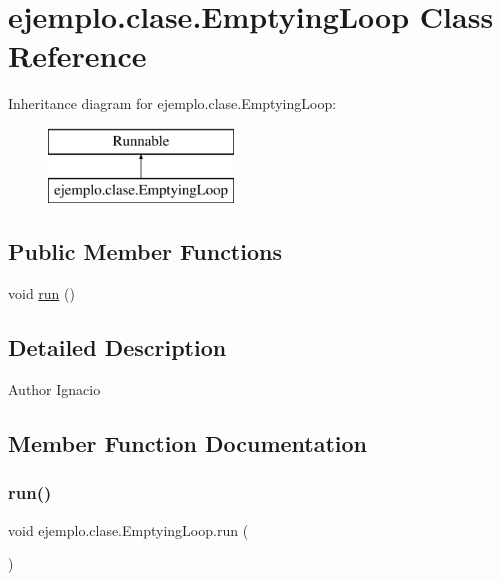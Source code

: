 \hypertarget{classejemplo_1_1clase_1_1_emptying_loop}{}\section{ejemplo.\+clase.\+Emptying\+Loop Class Reference}
\label{classejemplo_1_1clase_1_1_emptying_loop}
Inheritance diagram for ejemplo.\+clase.\+Emptying\+Loop\+:\begin{figure}[H]
\begin{center}
\leavevmode
\includegraphics[height=2.000000cm]{classejemplo_1_1clase_1_1_emptying_loop}
\end{center}
\end{figure}
\subsection*{Public Member Functions}
\begin{DoxyCompactItemize}
\item 
void \mbox{\hyperlink{classejemplo_1_1clase_1_1_emptying_loop_aa09be232e3626b42753cb521b8aa70e8}{run}} ()
\end{DoxyCompactItemize}


\subsection{Detailed Description}
\begin{DoxyAuthor}{Author}
Ignacio 
\end{DoxyAuthor}


\subsection{Member Function Documentation}
\mbox{\label{classejemplo_1_1clase_1_1_emptying_loop_aa09be232e3626b42753cb521b8aa70e8}} 
\subsubsection{\texorpdfstring{run()}{run()}}
{\footnotesize\ttfamily void ejemplo.\+clase.\+Emptying\+Loop.\+run (\begin{DoxyParamCaption}{ }\end{DoxyParamCaption})\hspace{0.3cm}{\ttfamily [inline]}}


